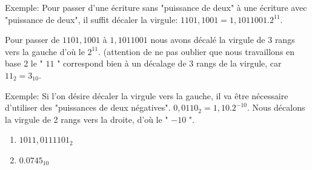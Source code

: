 Exemple: Pour passer d'une écriture sans "puissance de deux" à une écriture avec "puissance de deux", il suffit décaler la virgule: $1101,1001=1,1011001.2^{11}$.

 Pour passer de $1101,1001$ à $1,1011001$ nous avons décalé la virgule de 3 rangs vers la gauche d'où le $2^{11}$. (attention de ne pas oublier que nous travaillons en base 2 le " $11$ "  correspond bien à un décalage de 3 rangs de la virgule, car $11_2=3_{10}$.
 

Exemple: Si l'on désire décaler la virgule vers la gauche, il va être nécessaire d'utiliser des "puissances de deux négatives". $0,0110_2=1,10.2^{-10}$. Nous décalons la virgule de 2 rangs vers la droite, d'où le " $-10$ ".
 
 
 \bigskip

\begin{exercice_cours}{}
 \begin{enumerate}
 	\item $1011,0111101_2$ \dotfill
 	\item $0.0745_{10}$ \dotfill
 \end{enumerate}

\end{exercice_cours}